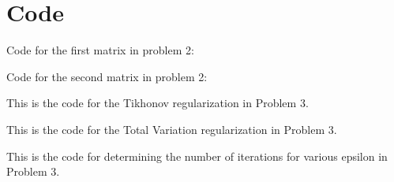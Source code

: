 \documentclass[11pt]{article}
\begin{document}
\section*{Code}
Code for the first matrix in problem 2: 


\newpage
Code for the second matrix in problem 2:


\newpage 
This is the code for the Tikhonov regularization in Problem 3.


\newpage 
This is the code for the Total Variation regularization in Problem 3.


\newpage 
This is the code for determining the number of iterations for various epsilon in Problem 3.

\end{document}
